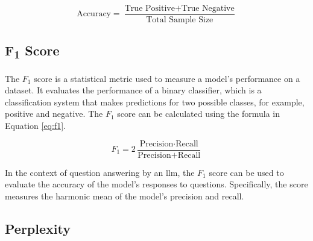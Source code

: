     \begin{equation}
        \text{Accuracy} = \frac{\text{True Positive} + \text{True Negative}}{\text{Total Sample Size}}
        \label{eq:accuracy}
    \end{equation}


    \subsection{F\textsubscript{1} Score}


    The $F_1$ score is a statistical metric used to measure a model's performance on a dataset. It evaluates the performance of a binary classifier, which is a classification system that makes predictions for two possible classes, for example, positive and negative. The $F_1$ score can be calculated using the formula in Equation \ref{eq:f1}.

    \begin{equation}
        F_1 = 2 \frac{\text{Precision} \cdot \text{Recall}}{\text{Precision} + \text{Recall}}
        \label{eq:f1}
    \end{equation}

    In the context of question answering by an \gls{llm}, the $F_1$ score can be used to evaluate the accuracy of the model's responses to questions. Specifically, the score measures the harmonic mean of the model's precision and recall.

    \subsection{Perplexity}

